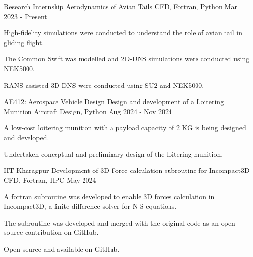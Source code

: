 
\begin{cventries}
  \cventry
  {Research Internship} %
  {Aerodynamics of Avian Tails} %
  {CFD, Fortran, Python} %
  {Mar 2023 - Present} %
  {
    \begin{cvitems} %
      \item {High-fidelity simulations were conducted to understand the role of avian tail in gliding flight.}
      \item {The Common Swift was modelled and 2D-DNS simulations were conducted using NEK5000.}
      \item {RANS-assisted 3D DNS were conducted using SU2 and NEK5000.}
    \end{cvitems}
  }
  \cventry
  {AE412: Aerospace Vehicle Design} %
  {Design and development of a Loitering Munition} %
  {Aircraft Design, Python} %
  {Aug 2024 - Nov 2024} %
  {
    \begin{cvitems} %
      \item {A low-cost loitering munition with a payload capacity of 2 KG is being designed and developed.}
      \item {Undertaken conceptual and preliminary design of the loitering munition.}
    \end{cvitems}
  }

  \cventry
  {IIT Kharagpur} %
  {Development of 3D Force calculation subroutine for Incompact3D} %
  {CFD, Fortran, HPC} %
  {May 2024} %
  {
    \begin{cvitems} %
      \item {A fortran subroutine was developed to enable 3D forces calculation in Incompact3D, a finite difference solver for N-S equations.}
      \item {The subroutine was developed and merged with the original code as an open-source contribution on GitHub.}
      \item {Open-source and available on GitHub.}
    \end{cvitems}
  }


\end{cventries}
